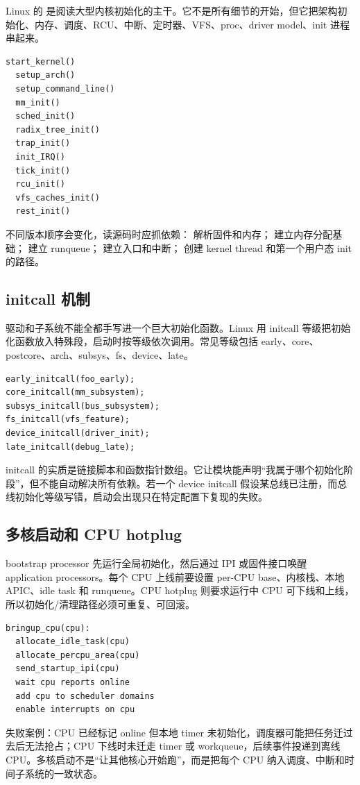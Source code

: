 Linux 的  是阅读大型内核初始化的主干。它不是所有细节的开始，但它把架构初始化、内存、调度、RCU、中断、定时器、VFS、proc、driver model、init 进程串起来。

\begin{lstlisting}
start_kernel()
  setup_arch()
  setup_command_line()
  mm_init()
  sched_init()
  radix_tree_init()
  trap_init()
  init_IRQ()
  tick_init()
  rcu_init()
  vfs_caches_init()
  rest_init()
\end{lstlisting}

不同版本顺序会变化，读源码时应抓依赖： 解析固件和内存； 建立内存分配基础； 建立 runqueue； 建立入口和中断； 创建 kernel thread 和第一个用户态 init 的路径。

\subsection{initcall 机制}

驱动和子系统不能全都手写进一个巨大初始化函数。Linux 用 initcall 等级把初始化函数放入特殊段，启动时按等级依次调用。常见等级包括 early、core、postcore、arch、subsys、fs、device、late。

\begin{lstlisting}
early_initcall(foo_early);
core_initcall(mm_subsystem);
subsys_initcall(bus_subsystem);
fs_initcall(vfs_feature);
device_initcall(driver_init);
late_initcall(debug_late);
\end{lstlisting}

initcall 的实质是链接脚本和函数指针数组。它让模块能声明“我属于哪个初始化阶段”，但不能自动解决所有依赖。若一个 device initcall 假设某总线已注册，而总线初始化等级写错，启动会出现只在特定配置下复现的失败。

\subsection{多核启动和 CPU hotplug}

bootstrap processor 先运行全局初始化，然后通过 IPI 或固件接口唤醒 application processors。每个 CPU 上线前要设置 per-CPU base、内核栈、本地 APIC、idle task 和 runqueue。CPU hotplug 则要求运行中 CPU 可下线和上线，所以初始化/清理路径必须可重复、可回滚。

\begin{lstlisting}
bringup_cpu(cpu):
  allocate_idle_task(cpu)
  allocate_percpu_area(cpu)
  send_startup_ipi(cpu)
  wait cpu reports online
  add cpu to scheduler domains
  enable interrupts on cpu
\end{lstlisting}

失败案例：CPU 已经标记 online 但本地 timer 未初始化，调度器可能把任务迁过去后无法抢占；CPU 下线时未迁走 timer 或 workqueue，后续事件投递到离线 CPU。多核启动不是“让其他核心开始跑”，而是把每个 CPU 纳入调度、中断和时间子系统的一致状态。

